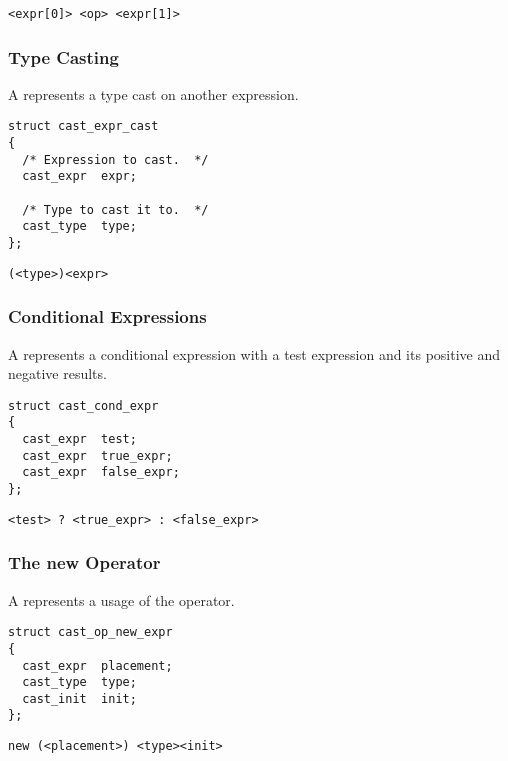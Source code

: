 \begin{verbatim}
<expr[0]> <op> <expr[1]>
\end{verbatim}

\subsubsection{Type Casting}

A  represents a type cast on another expression.

\begin{verbatim}
struct cast_expr_cast
{
  /* Expression to cast.  */
  cast_expr  expr;

  /* Type to cast it to.  */
  cast_type  type;
};
\end{verbatim}

\begin{verbatim}
(<type>)<expr>
\end{verbatim}

\subsubsection{Conditional Expressions}

A  represents a conditional expression with a test
expression and its positive and negative results.

\begin{verbatim}
struct cast_cond_expr
{
  cast_expr  test;
  cast_expr  true_expr;
  cast_expr  false_expr;
};
\end{verbatim}

\begin{verbatim}
<test> ? <true_expr> : <false_expr>
\end{verbatim}

\subsubsection{The new Operator}

A  represents a usage of the 
operator.

\begin{verbatim}
struct cast_op_new_expr
{
  cast_expr  placement;
  cast_type  type;
  cast_init  init;
};
\end{verbatim}

\begin{verbatim}
new (<placement>) <type><init>
\end{verbatim}

